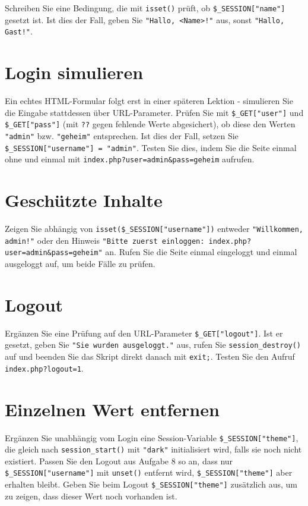 \documentclass[a4paper,12pt]{article}
\begin{document}
Schreiben Sie eine Bedingung, die mit \texttt{isset()} prüft, ob \texttt{\$\_SESSION["{}name"{}]} gesetzt ist. Ist dies der Fall, geben Sie \texttt{"{}Hallo, <Name>!"{}} aus, sonst \texttt{"{}Hallo, Gast!"{}}.

\section{Login simulieren}

Ein echtes HTML-Formular folgt erst in einer späteren Lektion - simulieren Sie die Eingabe stattdessen über URL-Parameter. Prüfen Sie mit \texttt{\$\_GET["{}user"{}]} und \texttt{\$\_GET["{}pass"{}]} (mit \texttt{??} gegen fehlende Werte abgesichert), ob diese den Werten \texttt{"{}admin"{}} bzw. \texttt{"{}geheim"{}} entsprechen. Ist dies der Fall, setzen Sie \texttt{\$\_SESSION["{}username"{}] = "{}admin"{}}. Testen Sie dies, indem Sie die Seite einmal ohne und einmal mit \texttt{index.php?user=admin\&pass=geheim} aufrufen.

\section{Geschützte Inhalte}

Zeigen Sie abhängig von \texttt{isset(\$\_SESSION["{}username"{}])} entweder \texttt{"{}Willkommen, admin!"{}} oder den Hinweis \texttt{"{}Bitte zuerst einloggen: index.php?user=admin\&pass=geheim"{}} an. Rufen Sie die Seite einmal eingeloggt und einmal ausgeloggt auf, um beide Fälle zu prüfen.

\section{Logout}

Ergänzen Sie eine Prüfung auf den URL-Parameter \texttt{\$\_GET["{}logout"{}]}. Ist er gesetzt, geben Sie \texttt{"{}Sie wurden ausgeloggt."{}} aus, rufen Sie \texttt{session\_destroy()} auf und beenden Sie das Skript direkt danach mit \texttt{exit;}. Testen Sie den Aufruf \texttt{index.php?logout=1}.

\section{Einzelnen Wert entfernen}

Ergänzen Sie unabhängig vom Login eine Session-Variable \texttt{\$\_SESSION["{}theme"{}]}, die gleich nach \texttt{session\_start()} mit \texttt{"{}dark"{}} initialisiert wird, falls sie noch nicht existiert. Passen Sie den Logout aus Aufgabe 8 so an, dass nur \texttt{\$\_SESSION["{}username"{}]} mit \texttt{unset()} entfernt wird, \texttt{\$\_SESSION["{}theme"{}]} aber erhalten bleibt. Geben Sie beim Logout \texttt{\$\_SESSION["{}theme"{}]} zusätzlich aus, um zu zeigen, dass dieser Wert noch vorhanden ist.
\end{document}
